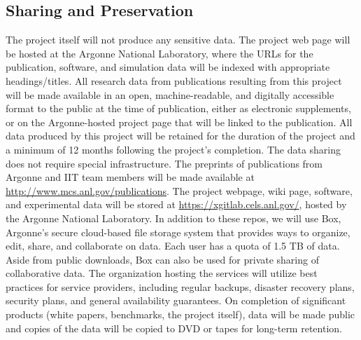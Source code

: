\subsection*{Sharing and Preservation}
The project itself will not produce any sensitive data.
The project web page will be hosted at the Argonne National Laboratory, where the
URLs for the publication, software, and simulation data will be indexed with
appropriate headings/titles.
All research data from publications resulting from this project will be made available in an open, machine-readable, and digitally accessible format to the public at
the time of publication, either as electronic supplements, or on the Argonne-hosted project page that will be linked to the publication.
All data produced by this project will be retained for the duration of the
project and a minimum of 12 months following the project's completion.
The data sharing does not require special infrastructure.
The preprints of publications from Argonne and IIT team members will be made available at
\url{http://www.mcs.anl.gov/publications}. The project webpage, wiki page,
software, and experimental data will be stored
at \url{https://xgitlab.cels.anl.gov/}, %
hosted by the Argonne National Laboratory. In addition to these repos, we will
use Box, Argonne's secure cloud-based file storage system that provides ways to
organize, edit, share, and collaborate on data. Each user has a quota of 1.5 TB
of data. Aside from public downloads, Box can also be used for private sharing
of collaborative data. The organization hosting the services will utilize best
practices for service providers, including regular backups, disaster recovery
plans, security plans, and general availability guarantees.
On completion of significant products (white papers, benchmarks, the project
itself), data will be made public and copies of the data will be copied to DVD
or tapes for long-term retention.

